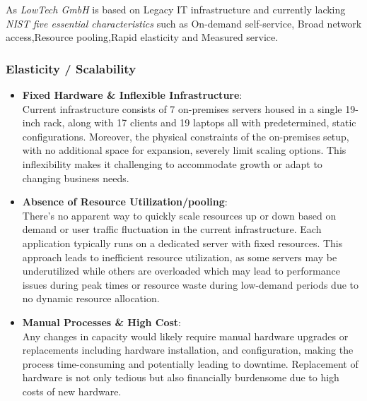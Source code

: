\documentclass{llncs}
\begin{document}
As \textit{LowTech GmbH} is based on Legacy IT infrastructure and currently lacking \textit{NIST five
  essential characteristics} such as On-demand self-service, Broad network access,Resource pooling,Rapid elasticity and Measured service.

\subsubsection*{Elasticity / Scalability}

\begin{itemize}
  \item \textbf{Fixed Hardware \& Inflexible Infrastructure}:
        \\
        Current infrastructure consists of 7 on-premises servers housed in a single 19-inch rack, 
        along with 17 clients and 19 laptops all with predetermined, static configurations. 
        Moreover, the physical constraints of the on-premises setup, with no additional space for expansion, severely limit scaling options. 
        This inflexibility makes it challenging to accommodate growth or adapt to changing business needs.
        \\
  \item \textbf{Absence of Resource Utilization/pooling}:
        \\ 
        There's no apparent way to quickly scale resources up or down based on demand or user traffic fluctuation in the current infrastructure. 
        Each application typically runs on a dedicated server with fixed resources. 
        This approach leads to inefficient resource utilization, as some servers may be underutilized while others are overloaded which may lead to performance issues during peak times or resource waste during low-demand periods due to no dynamic resource allocation.
        \\
  \item \textbf{Manual Processes \& High Cost}:
        \\ 
        Any changes in capacity would likely require manual hardware upgrades or replacements including hardware installation,
        and configuration, making the process time-consuming and potentially leading to downtime.
        Replacement of hardware is not only tedious but also financially burdensome due to high costs of new hardware.
        
\end{itemize}
\end{document}
